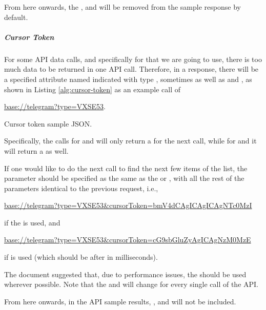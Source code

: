 From here onwards, the ,  and  will be removed from the sample response by default.

\subparagraph{Cursor Token}

For some API data calls, and specifically for  that we are going to use, there is too much data to be returned in one API call. Therefore, in a response, there will be a specified attribute named  indicated with type , sometimes as well as  and , as shown in Listing \ref{alg:cursor-token} as an example call of
\begin{center}
    \url{base://telegram?type=VXSE53}.
\end{center}

\begin{listing}[!ht]
    \caption{Cursor token sample JSON.}
    \label{alg:cursor-token}
\end{listing}

Specifically, the calls for  and  will only return a  for the next call, while for  and  it will return a  as well.

If one would like to do the next call to find the next few items of the list, the  parameter should be specified as the same as the  or , with all the rest of the parameters identical to the previous request, i.e.,
\begin{center}
    \url{base://telegram?type=VXSE53&cursorToken=bmV4dCAgICAgICAgNTc0MzI}
\end{center}
if the  is used, and
\begin{center}
    \url{base://telegram?type=VXSE53&cursorToken=cG9sbGluZyAgICAgNzM0MzE}
\end{center}
if  is used (which should be after  in milliseconds).

The document suggested that, due to performance issues, the  should be used wherever possible. Note that the  and  will change for every single call of the API.

From here onwards, in the API sample results, ,  and  will not be included.

